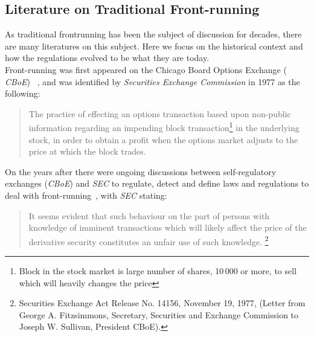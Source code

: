 \subsection{Literature on Traditional Front-running}


As traditional frontrunning has been the subject of discussion for decades, there are many literatures on this subject. Here we focus on the historical context and how the regulations evolved to be what they are today.\\
Front-running was first appeared on the Chicago Board Options Exchange ( \textit{CBoE}) ~\cite{markham1988front}, and was identified by \textit{Securities Exchange Commission} in 1977 as the following:
\begin{quote}
The practice of effecting an options transaction based upon non-public information regarding an impending block transaction\footnote{Block in the stock market is large number of shares, 10\,000 or more, to sell which will heavily changes the price} in the underlying stock, in order to obtain a profit when the options market adjusts to the price at which the block trades. ~\cite{sec1978optionsmarket}
\end{quote} 



On the years after there were ongoing discussions between self-regulatory exchanges (\eg \textit{CBoE}) and  \textit{SEC} to regulate, detect and define laws and regulations to deal with front-running~\cite{markham1988front}, with \textit{SEC} stating: 
\begin{quote}
It seems evident that such behaviour on the part of persons with knowledge of imminent transactions which will likely affect the price of the derivative security constitutes an unfair use of such knowledge. \footnote{Securities Exchange Act Release No. 14156, November 19, 1977, (Letter from George A. Fitzsimmons, Secretary, Securities and Exchange Commission to Joseph W. Sullivan, President  CBoE).}
\end{quote} 

